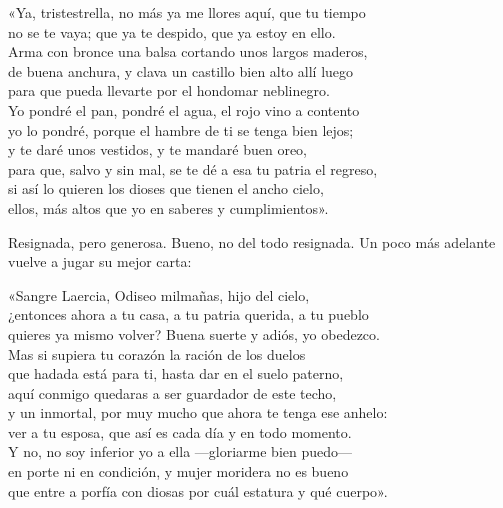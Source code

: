 \begin{versocita}
«Ya, tristestrella, no más ya me llores aquí, que tu tiempo\\
no se te vaya; que ya te despido, que ya estoy en ello.\\
Arma con bronce una balsa cortando unos largos maderos,\\
de buena anchura, y clava un castillo bien alto allí luego\\
para que pueda llevarte por el hondomar neblinegro.\\
Yo pondré el pan, pondré el agua, el rojo vino a contento\\
yo lo pondré, porque el hambre de ti se tenga bien lejos;\\
y te daré unos vestidos, y te mandaré buen oreo,\\
para que, salvo y sin mal, se te dé a esa tu patria el regreso,\\
si así lo quieren los dioses que tienen el ancho cielo,\\
ellos, más altos que yo en saberes y cumplimientos».
\end{versocita}

Resignada, pero generosa. Bueno, no del todo resignada. Un poco más adelante vuelve a jugar su mejor carta:

\begin{versocita}
«Sangre Laercia, Odiseo milmañas, hijo del cielo,\\
¿entonces ahora a tu casa, a tu patria querida, a tu pueblo\\
quieres ya mismo volver? Buena suerte y adiós, yo obedezco.\\
Mas si supiera tu corazón la ración de los duelos\\
que hadada está para ti, hasta dar en el suelo paterno,\\
aquí conmigo quedaras a ser guardador de este techo,\\
y un inmortal, por muy mucho que ahora te tenga ese anhelo:\\
ver a tu esposa, que así es cada día y en todo momento.\\
Y no, no soy inferior yo a ella ---gloriarme bien puedo---\\
en porte ni en condición, y mujer moridera no es bueno\\
que entre a porfía con diosas por cuál estatura y qué cuerpo».
\end{versocita}

